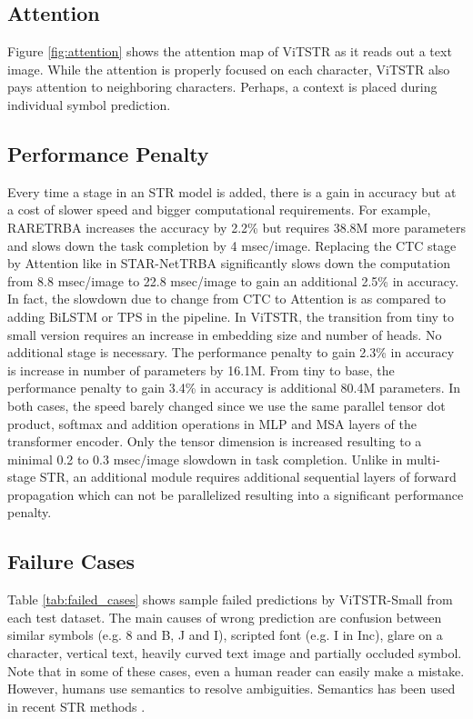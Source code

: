 \documentclass[runningheads]{llncs}
\begin{document}
\subsection{Attention}
Figure \ref{fig:attention} shows the attention map of ViTSTR as it reads out a text image. While the attention is properly focused on each character, ViTSTR also pays attention to neighboring characters. Perhaps, a context is placed during individual symbol prediction.

\subsection{Performance Penalty}
Every time a stage in an STR model is added, there is a gain in accuracy but at a cost of slower speed and bigger computational requirements. For example, RARETRBA increases the accuracy by 2.2\% but requires 38.8M more parameters and slows down the task completion by 4 msec/image. Replacing the CTC stage by Attention like in STAR-NetTRBA significantly slows down the computation from 8.8 msec/image to 22.8 msec/image to gain an additional 2.5\% in accuracy. In fact, the slowdown due to change from CTC to Attention is  as compared to adding BiLSTM or TPS in the pipeline. In ViTSTR, the transition from tiny to small version requires an increase in embedding size and number of heads. No additional stage is necessary. The performance penalty to gain 2.3\% in accuracy is increase in number of parameters by 16.1M. From tiny to base, the performance penalty to gain 3.4\% in accuracy is additional 80.4M parameters. In both cases, the speed barely changed since we use the same parallel tensor dot product, softmax and addition operations in MLP and MSA layers of the transformer encoder. Only the tensor dimension is increased resulting to a minimal 0.2 to 0.3 msec/image slowdown in task completion.  Unlike in multi-stage STR, an additional module requires additional sequential layers of forward propagation which can not be parallelized resulting into a significant performance penalty.

\subsection{Failure Cases}
Table \ref{tab:failed_cases} shows sample failed predictions by ViTSTR-Small from each test dataset. The main causes of wrong prediction are confusion between similar symbols (e.g. 8 and B, J and I), scripted font (e.g. I in Inc), glare on a character, vertical text, heavily curved text image and partially occluded symbol. Note that in some of these cases, even a human reader can easily make a mistake. However, humans use semantics to resolve ambiguities. Semantics has been used in recent STR methods \cite{qiao2020seed,yu2020towards}.
\end{document}
